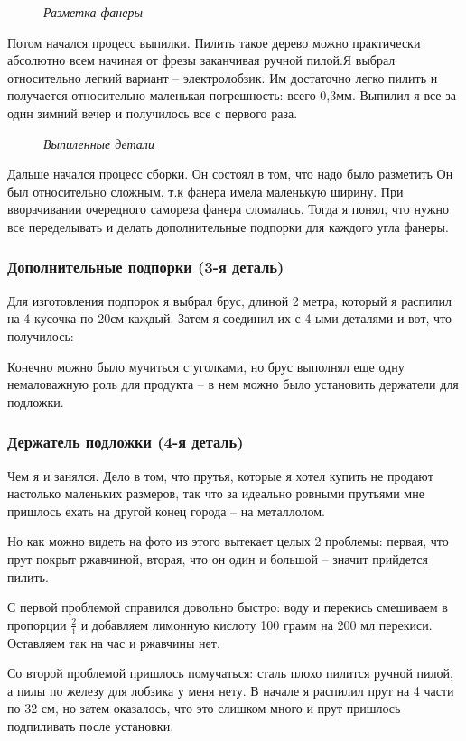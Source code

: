 \documentclass[a4paper, 12pt]{article}
\newcommand{\image}[3]{
	\begin{figure}[ht]
		\center{\texttt{[image: img/\#1]} }
		\caption{\textit{#3}}\end{figure}
}
\begin{document}
\image{разметка фанеры.jpg}{200}{Разметка фанеры}

Потом начался процесс выпилки. Пилить такое дерево можно практически абсолютно
всем начиная от фрезы заканчивая ручной пилой.Я выбрал относительно легкий
вариант -- электролобзик. Им достаточно легко пилить и получается относительно
маленькая погрешность: всего 0,3мм. Выпилил я все за один зимний вечер и
получилось все с первого раза.

\image{разметка фанеры.jpg}{200}{Выпиленные детали}

\newpage
Дальше начался процесс сборки. Он состоял в том, что надо было разметить  Он был
относительно сложным, т.к фанера имела маленькую ширину.
При вворачивании очередного самореза фанера сломалась. Тогда
я понял, что нужно все переделывать и делать дополнительные подпорки для
каждого угла фанеры.

\subsubsection{Дополнительные подпорки (3-я деталь)}

Для изготовления подпорок я выбрал брус, длиной 2 метра, который я распилил
на 4 кусочка по 20см каждый. Затем я соединил их с 4-ыми деталями и вот, что
получилось:

Конечно можно было мучиться с уголками, но брус выполнял еще одну немаловажную
роль для продукта -- в нем можно было установить держатели для подложки.

\subsubsection{Держатель подложки (4-я деталь)}

Чем я и занялся. Дело в том, что прутья, которые я хотел купить не продают
настолько маленьких размеров, так что за идеально ровными прутьями мне пришлось
ехать на другой конец города -- на металлолом.

Но как можно видеть на фото из этого вытекает целых 2 проблемы: первая, что
прут покрыт ржавчиной, вторая, что он один и большой -- значит прийдется
пилить.

С первой проблемой справился довольно быстро: воду и перекись смешиваем в
пропорции $\frac{2}{1}$ и добавляем лимонную кислоту 100 грамм на 200 мл
перекиси. Оставляем так на час и ржавчины нет.

Со второй проблемой пришлось помучаться: сталь плохо пилится ручной пилой,
а пилы по железу для лобзика у меня нету. В начале я распилил прут на 4 части
по 32 см, но затем оказалось, что это слишком много и прут пришлось подпиливать
после установки.
\end{document}
